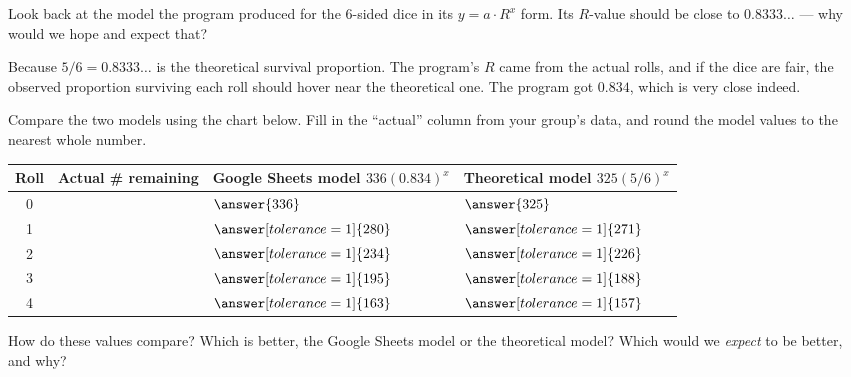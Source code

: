 \documentclass[12pt]{ximera}
\begin{document}
\begin{problem}
Look back at the model the program produced for the 6-sided dice in its
$y = a \cdot R^{x}$ form. Its $R$-value should be close to $0.8333\ldots$ --- why
would we hope and expect that?

\begin{freeResponse}
\end{freeResponse}

\begin{solution}
Because $5/6 = 0.8333\ldots$ is the theoretical survival proportion. The program's
$R$ came from the actual rolls, and if the dice are fair, the observed proportion
surviving each roll should hover near the theoretical one. The program got $0.834$,
which is very close indeed.
\end{solution}
\end{problem}

\begin{problem}
Compare the two models using the chart below. Fill in the ``actual'' column from your
group's data, and round the model values to the nearest whole number.

\begin{center}
\begin{tabular}{|c|l|l|l|}
\hline
Roll & Actual \# remaining & Google Sheets model $336(0.834)^{x}$ & Theoretical model $325(5/6)^{x}$ \\
\hline
0 & & $\answer{336}$ & $\answer{325}$ \\
\hline
1 & & $\answer[tolerance=1]{280}$ & $\answer[tolerance=1]{271}$ \\
\hline
2 & & $\answer[tolerance=1]{234}$ & $\answer[tolerance=1]{226}$ \\
\hline
3 & & $\answer[tolerance=1]{195}$ & $\answer[tolerance=1]{188}$ \\
\hline
4 & & $\answer[tolerance=1]{163}$ & $\answer[tolerance=1]{157}$ \\
\hline
\end{tabular}
\end{center}
\end{problem}

\begin{problem}
How do these values compare? Which is better, the Google Sheets model or the
theoretical model? Which would we \emph{expect} to be better, and why?

\begin{freeResponse}
\end{freeResponse}
\end{problem}
\end{document}
